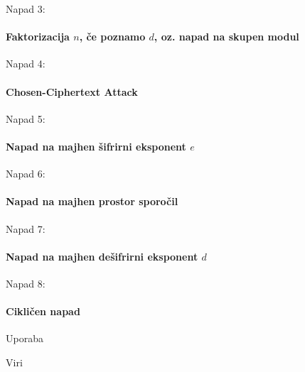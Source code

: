 \documentclass[a4paper, 12pt]{beamer} %
\begin{document}
\begin{frame}{Napad 3:}
\framesubtitle{Faktorizacija $n$, če poznamo $d$, oz. napad na skupen modul}
\end{frame}

\begin{frame}{Napad 4:}
\framesubtitle{Chosen-Ciphertext Attack}
\end{frame}

\begin{frame}{Napad 5:}
 \framesubtitle{Napad na majhen šifrirni eksponent $e$}
\end{frame}

\begin{frame}{Napad 6:}
\framesubtitle{Napad na majhen prostor sporočil}
\end{frame}

\begin{frame}{Napad 7:}
\framesubtitle{Napad na majhen dešifrirni eksponent $d$}
\end{frame}

\begin{frame}{Napad 8:}
\framesubtitle{Cikličen napad}
\end{frame}

\begin{frame}{Uporaba}
\end{frame}

\begin{frame}{Viri}
\end{frame}
\end{document}

